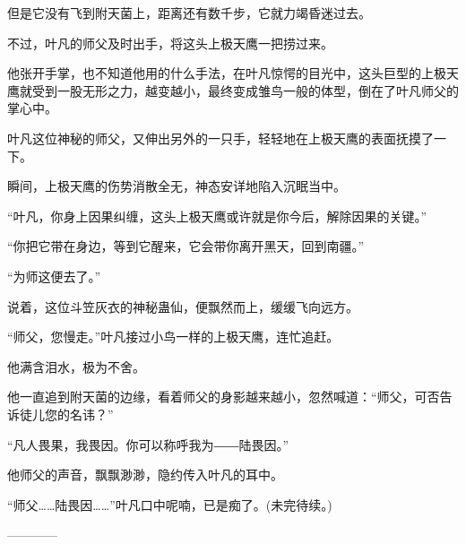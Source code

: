 \begin{this_body}
但是它没有飞到附天菌上，距离还有数千步，它就力竭昏迷过去。

不过，叶凡的师父及时出手，将这头上极天鹰一把捞过来。

他张开手掌，也不知道他用的什么手法，在叶凡惊愕的目光中，这头巨型的上极天鹰就受到一股无形之力，越变越小，最终变成雏鸟一般的体型，倒在了叶凡师父的掌心中。

叶凡这位神秘的师父，又伸出另外的一只手，轻轻地在上极天鹰的表面抚摸了一下。

瞬间，上极天鹰的伤势消散全无，神态安详地陷入沉眠当中。

“叶凡，你身上因果纠缠，这头上极天鹰或许就是你今后，解除因果的关键。”

“你把它带在身边，等到它醒来，它会带你离开黑天，回到南疆。”

“为师这便去了。”

说着，这位斗笠灰衣的神秘蛊仙，便飘然而上，缓缓飞向远方。

“师父，您慢走。”叶凡接过小鸟一样的上极天鹰，连忙追赶。

他满含泪水，极为不舍。

他一直追到附天菌的边缘，看着师父的身影越来越小，忽然喊道：“师父，可否告诉徒儿您的名讳？”

“凡人畏果，我畏因。你可以称呼我为――陆畏因。”

他师父的声音，飘飘渺渺，隐约传入叶凡的耳中。

“师父……陆畏因……”叶凡口中呢喃，已是痴了。(未完待续。)

------------

\end{this_body}

